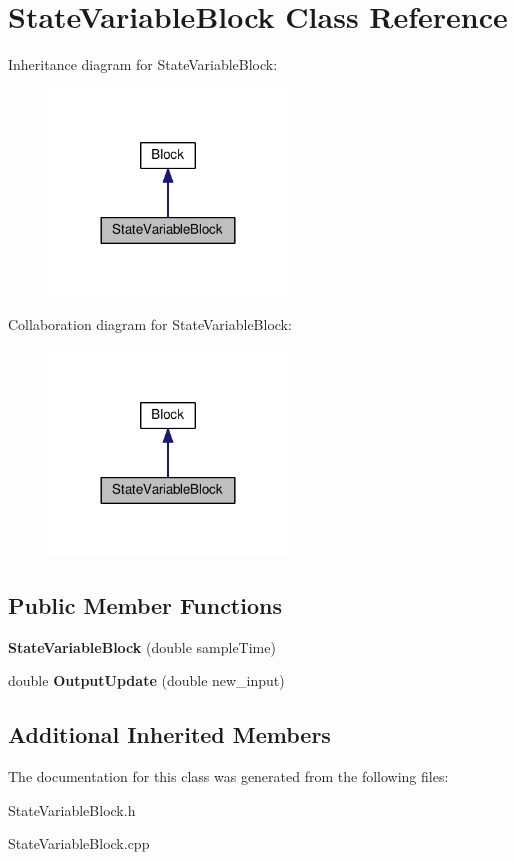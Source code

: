\hypertarget{classStateVariableBlock}{}\section{State\+Variable\+Block Class Reference}
\label{classStateVariableBlock}


Inheritance diagram for State\+Variable\+Block\+:\nopagebreak
\begin{figure}[H]
\begin{center}
\leavevmode
\includegraphics[width=180pt]{classStateVariableBlock__inherit__graph}
\end{center}
\end{figure}


Collaboration diagram for State\+Variable\+Block\+:\nopagebreak
\begin{figure}[H]
\begin{center}
\leavevmode
\includegraphics[width=180pt]{classStateVariableBlock__coll__graph}
\end{center}
\end{figure}
\subsection*{Public Member Functions}
\begin{DoxyCompactItemize}
\item 
\mbox{\label{classStateVariableBlock_a11e0cfeb7ab94b63a8a5d82d5d41cfc9}} 
{\bfseries State\+Variable\+Block} (double sample\+Time)
\item 
\mbox{\label{classStateVariableBlock_a29725438c8df4b7a4ae6822797977a36}} 
double {\bfseries Output\+Update} (double new\+\_\+input)
\end{DoxyCompactItemize}
\subsection*{Additional Inherited Members}


The documentation for this class was generated from the following files\+:\begin{DoxyCompactItemize}
\item 
State\+Variable\+Block.\+h\item 
State\+Variable\+Block.\+cpp\end{DoxyCompactItemize}
